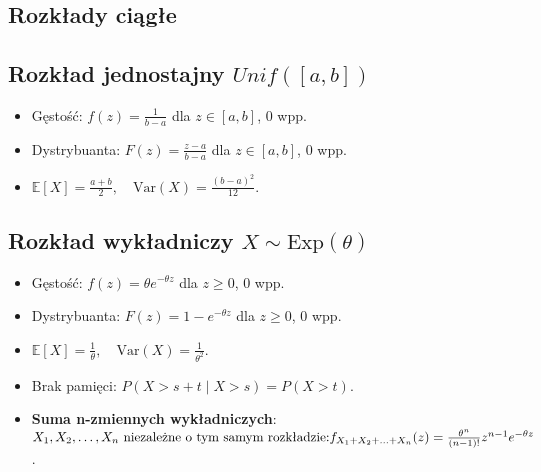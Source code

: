 \documentclass{article}
\theoremstyle{definition}
\theoremstyle{remark}
\begin{document}
\begin{multicols}{2}
    \section*{Rozkłady ciągłe}

    \subsection*{Rozkład jednostajny \(Unif([a, b]) \)}
    \begin{itemize}[itemsep=0pt, left=0pt]
        \item Gęstość: \( f(z) = \frac{1}{b-a} \) dla \( z \in [a, b] \), 0 wpp.
        \item Dystrybuanta: \( F(z) = \frac{z-a}{b-a} \) dla \( z \in [a, b] \), 0 wpp.
        \item \(\mathbb{E}[X] = \frac{a+b}{2}, \quad \text{Var}(X) = \frac{(b-a)^2}{12}\).
    \end{itemize}

    \subsection*{Rozkład wykładniczy \( X \sim \text{Exp}(\theta) \)}
    \begin{itemize}[itemsep=0pt, left=0pt]
        \item Gęstość: \( f(z) = \theta e^{-\theta z} \) dla \( z \geq 0 \), 0 wpp.
        \item Dystrybuanta: \( F(z) = 1 - e^{-\theta z} \) dla \( z \geq 0 \), 0 wpp.
        \item \(\mathbb{E}[X] = \frac{1}{\theta}, \quad \text{Var}(X) = \frac{1}{\theta^2}\).
        \item Brak pamięci: \( P(X > s+t \mid X > s) = P(X > t) \). 
          
        \item \textbf{Suma n-zmiennych wykładniczych}: \(X_1, X_2, \ldots, X_n \\
        \text{ niezależne o tym samym rozkładzie:} \\
         f_{X_1 + X_2 + \ldots + X_n}(z) =  \frac{\theta^n}{(n-1)!}z^{n-1}e^{-\theta z}\).
    \end{itemize}


\end{multicols}
\end{document}
